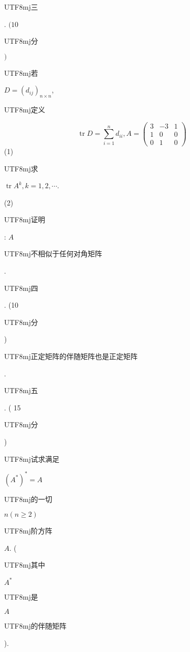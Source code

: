 \documentclass[10pt]{article}
\begin{document}
\begin{CJK}{UTF8}{mj}三\end{CJK}. $(10$ \begin{CJK}{UTF8}{mj}分\end{CJK} $)$ \begin{CJK}{UTF8}{mj}若\end{CJK} $D=\left(d_{i j}\right)_{n \times n}$, \begin{CJK}{UTF8}{mj}定义\end{CJK}
$$
\operatorname{tr} D=\sum_{i=1}^{n} d_{i i}, A=\left(\begin{array}{ccc}
3 & -3 & 1 \\
1 & 0 & 0 \\
0 & 1 & 0
\end{array}\right)
$$
(1) \begin{CJK}{UTF8}{mj}求\end{CJK} $\operatorname{tr} A^{k}, k=1,2, \cdots$.

(2) \begin{CJK}{UTF8}{mj}证明\end{CJK}: $A$ \begin{CJK}{UTF8}{mj}不相似于任何对角矩阵\end{CJK}.

\begin{CJK}{UTF8}{mj}四\end{CJK}. (10 \begin{CJK}{UTF8}{mj}分\end{CJK}) \begin{CJK}{UTF8}{mj}正定矩阵的伴随矩阵也是正定矩阵\end{CJK}.

\begin{CJK}{UTF8}{mj}五\end{CJK}. ( 15 \begin{CJK}{UTF8}{mj}分\end{CJK}) \begin{CJK}{UTF8}{mj}试求满足\end{CJK} $\left(A^{*}\right)^{*}=A$ \begin{CJK}{UTF8}{mj}的一切\end{CJK} $n(n \geqslant 2)$ \begin{CJK}{UTF8}{mj}阶方阵\end{CJK} $A$. (\begin{CJK}{UTF8}{mj}其中\end{CJK} $A^{*}$ \begin{CJK}{UTF8}{mj}是\end{CJK} $A$ \begin{CJK}{UTF8}{mj}的伴随矩阵\end{CJK}).
\end{document}
